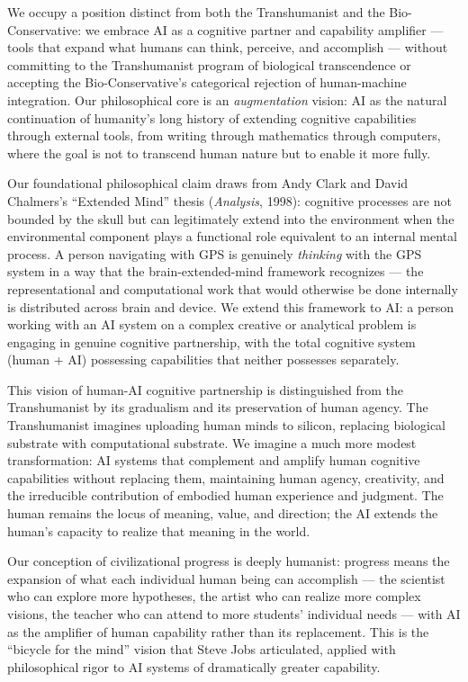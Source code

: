 We occupy a position distinct from both the Transhumanist and the
Bio-Conservative: we embrace AI as a cognitive partner and capability
amplifier --- tools that expand what humans can think, perceive, and
accomplish --- without committing to the Transhumanist program of
biological transcendence or accepting the Bio-Conservative's categorical
rejection of human-machine integration. Our philosophical core is an
\emph{augmentation} vision: AI as the natural continuation of humanity's
long history of extending cognitive capabilities through external tools,
from writing through mathematics through computers, where the goal is
not to transcend human nature but to enable it more fully.

Our foundational philosophical claim draws from Andy Clark and David
Chalmers's ``Extended Mind'' thesis (\emph{Analysis}, 1998): cognitive
processes are not bounded by the skull but can legitimately extend into
the environment when the environmental component plays a functional role
equivalent to an internal mental process. A person navigating with GPS
is genuinely \emph{thinking} with the GPS system in a way that the
brain-extended-mind framework recognizes --- the representational and
computational work that would otherwise be done internally is
distributed across brain and device. We extend this framework to AI: a
person working with an AI system on a complex creative or analytical
problem is engaging in genuine cognitive partnership, with the total
cognitive system (human + AI) possessing capabilities that neither
possesses separately.

This vision of human-AI cognitive partnership is distinguished from the
Transhumanist by its gradualism and its preservation of human agency.
The Transhumanist imagines uploading human minds to silicon, replacing
biological substrate with computational substrate. We imagine a much
more modest transformation: AI systems that complement and amplify human
cognitive capabilities without replacing them, maintaining human agency,
creativity, and the irreducible contribution of embodied human
experience and judgment. The human remains the locus of meaning, value,
and direction; the AI extends the human's capacity to realize that
meaning in the world.

Our conception of civilizational progress is deeply humanist: progress
means the expansion of what each individual human being can accomplish
--- the scientist who can explore more hypotheses, the artist who can
realize more complex visions, the teacher who can attend to more
students' individual needs --- with AI as the amplifier of human
capability rather than its replacement. This is the ``bicycle for the
mind'' vision that Steve Jobs articulated, applied with philosophical
rigor to AI systems of dramatically greater capability.


